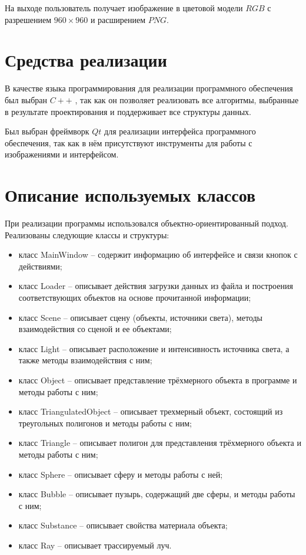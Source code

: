 На выходе пользователь получает изображение в цветовой модели $RGB$ с разрешением ${960}\times{960}$ и расширением $PNG$.


\section{Средства реализации}

В качестве языка программирования для реализации программного обеспечения был выбран $C++$ \cite{c++}, так как он позволяет реализовать все алгоритмы, выбранные в результате проектирования и поддерживает все структуры данных.

Был выбран фреймворк $Qt$ \cite{qt} для реализации интерфейса программного обеспечения, так как в нём присутствуют инструменты для работы с изображениями и интерфейсом.

\section{Описание используемых классов}

При реализации программы использовался объектно-ориентированный подход. Реализованы следующие классы и структуры:

\begin{itemize}
    \item класс MainWindow -- содержит информацию об интерфейсе и связи кнопок с действиями;
    \item класс Loader -- описывает действия загрузки данных из файла и построения соответствующих объектов на основе прочитанной информации;
    \item класс Scene -- описывает сцену (объекты, источники света), методы взаимодействия со сценой и ее объектами;
    \item класс Light -- описывает расположение и интенсивность источника света, а также методы взаимодействия с ним;
    \item класс Object -- описывает представление трёхмерного объекта в программе и методы работы с ним;
    \item класс TriangulatedObject -- описывает трехмерный объект, состоящий из треугольных полигонов и методы работы с ним;
    \item класс Triangle -- описывает полигон для представления трёхмерного объекта и методы работы с ним;
    \item класс Sphere -- описывает сферу и методы работы с ней;
    \item класс Bubble -- описывает пузырь, содержащий две сферы, и методы работы с ним;
    \item класс Substance -- описывает свойства материала объекта;
    \item класс Ray -- описывает трассируемый луч.
\end{itemize}

